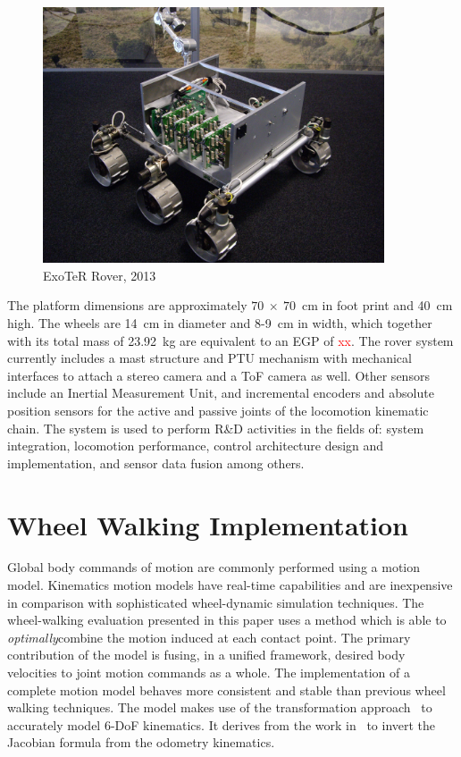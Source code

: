 \documentclass[a4paper,twocolumn]{esapub2005} %
\begin{document}
\begin{figure}[h!]
    \centering
    \includegraphics[width=0.9\textwidth]{ExoterRover2013.jpg}
    \caption{ExoTeR Rover, 2013}
    \label{fig:volley}
\end{figure}

The platform dimensions are approximately $70~\times~70$~\unit{cm} in foot
print and 40~\unit{cm} high.  The wheels are 14~\unit{cm} in diameter and
8-9~\unit{cm} in width, which together with its total mass of 23.92~\unit{kg}
are equivalent to an EGP of \textcolor{red}{xx}.  The rover system currently
includes a mast structure and PTU mechanism with mechanical interfaces to
attach a stereo camera and a ToF camera as well. Other sensors include an
Inertial Measurement Unit, and incremental encoders and absolute position
sensors for the active and passive joints of the locomotion kinematic chain.
The system is used to perform R\&D activities in the fields of: system
integration, locomotion performance, control architecture design and
implementation, and sensor data fusion among others. 

\section{Wheel Walking Implementation}

Global body commands of motion are commonly performed using a motion model.
Kinematics motion models have real-time capabilities and are inexpensive in
comparison with sophisticated wheel-dynamic simulation techniques.  The
wheel-walking evaluation presented in this paper uses a method which is able to
\textit{optimally}\footnotemark[2] combine the motion induced at each contact
point. The primary contribution of the model is fusing, in a unified framework,
desired body velocities to joint motion commands as a whole.  The
implementation of a complete motion model behaves more consistent and stable
than previous wheel walking techniques. The model makes use of the
transformation approach~\cite{Tarokh2005} to accurately model 6-DoF kinematics.
It derives from the work in~\cite{Hidalgo-Carrio2014} to invert the Jacobian
formula from the odometry kinematics.
\end{document}
